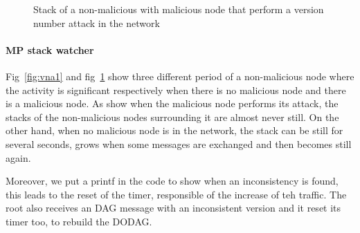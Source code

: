 \documentclass{report}
\begin{document}
\begin{figure}
    \caption{Stack of a non-malicious with malicious node that perform
    a version number attack in the network}
\label{fig:vna2}
\end{figure}

\paragraph{MP stack watcher}
Fig~\ref{fig:vna1} and fig~\ref{fig:vna2} show
three different period of a non-malicious node
where the activity is significant respectively when there is no
malicious node and there is a malicious node.
As show when the malicious node performs its attack, the stacks of the
non-malicious nodes surrounding it are almost never still. On the other
hand, when no malicious node is in the network, the stack can be still
for several seconds, grows when some messages are exchanged and then
becomes still again.

Moreover, we put a printf in the code to show when an inconsistency is
found, this leads to the reset of the timer, responsible of the increase
of teh traffic. The root also receives an DAG message with an
inconsistent version and it reset its timer too, to rebuild the \textsc{DODAG}.\\
\end{document}

